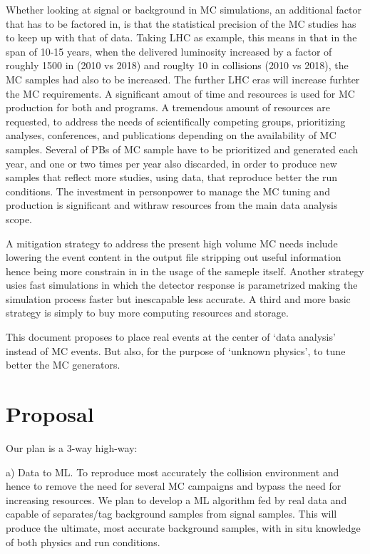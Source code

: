 Whether looking at signal or background in MC simulations, an additional factor that has to be factored in, is that the statistical precision of the MC studies has to keep up with that of data. Taking LHC as example, this means in that in the span of 10-15 years, when the delivered luminosity increased by a factor of roughly 1500 in \pp (2010 vs 2018) and rouglty 10 in \PbPb collisions (2010 vs 2018), the MC samples had also to be increased. The further LHC eras will increase furhter the MC requirements. A significant amout of time and resources is used for MC production for both \pp and \PbPb programs. A tremendous amount of resources are requested, to address the needs of scientifically competing groups, prioritizing analyses, conferences, and publications depending on the availability of MC samples. Several of PBs of MC sample have to be prioritized and generated each year, and one or two times per year also discarded, in order to produce new samples that reflect more studies, using data, that reproduce better the run conditions. The investment in personpower to manage the MC tuning and production is significant and withraw resources from the main data analysis scope. 

A mitigation strategy to address the present high volume MC needs include lowering the event content in the output file stripping out useful information hence being more constrain in in the usage of the sameple itself. Another strategy usies fast simulations in which the detector response is parametrized making the simulation process faster but inescapable less accurate. A third and more basic strategy is simply to buy more computing resources and storage. 

This document proposes to place real events at the center of `data analysis' instead of MC events. But also, for the purpose of `unknown physics', to tune better the MC generators.

\section{Proposal}
Our plan is a 3-way high-way: 

a) Data to ML. To reproduce most accurately the collision environment and hence to remove the need for several MC campaigns and bypass the need for increasing resources. We plan to develop a ML algorithm fed by real data and capable of separates/tag  background samples from signal samples. This will produce the ultimate, most accurate background samples, with in situ knowledge of both physics and run conditions. 

